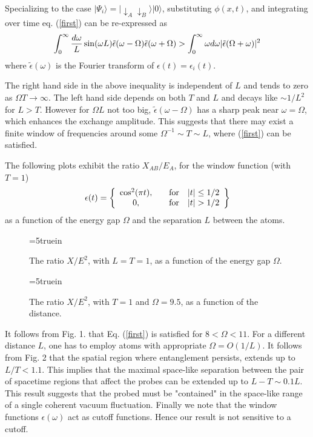 \documentclass[12pt]{article}
\newcommand{\beq}{\begin{equation}}
\newcommand{\eeq}{\end{equation}}
\def \ra {\rangle}
\def \down {\downarrow}
\begin{document}
Specializing to the case $|\Psi_i\ra=|\down_A\down_B\ra|0\ra$,
substituting $\phi(x,t)$, and
integrating over time
eq. (\ref{first}) can be re-expressed as
\beq
  \int_0^\infty {d\omega\over L} \sin({\omega L}) \tilde\epsilon
(\omega-\Omega)
\tilde\epsilon(\omega+\Omega) >
\int_0^\infty \omega d\omega |\tilde\epsilon (\Omega+\omega)|^2
\eeq
where $\tilde\epsilon(\omega)$
is the Fourier transform of $\epsilon(t)=\epsilon_i(t)$.

The right hand side in the above inequality is independent of $L$
and tends to
zero as $\Omega T\to \infty$. The left hand side depends on both
$T$ and $L$
and decays like $\sim 1/L^2$ for $L>T$.
However for $\Omega L$ not too big,
$\tilde \epsilon(\omega-\Omega)$ has a sharp peak near
 $\omega=\Omega$, which enhances the exchange amplitude.
This suggests that there may exist a finite window of
frequencies around some $\Omega^{-1}\sim T \sim L$, where
(\ref{first})
can be satisfied.

The following plots exhibit
the ratio $X_{AB}/E_A$, for the window function (with $T=1$)
\beq
\epsilon(t) = \left\{   \begin{array}{cc} {\cos^2(\pi t)},
& \ \ \ {\rm for} \ \ \ |t| \le 1/2 \\
              0 , &  \ \ \ {\rm for} \ \ \ |t|>1/2 \end{array}
\right\}
\eeq
as a function of the energy gap $\Omega$ and the separation $L$
between the atoms.

\begin{figure} \epsfxsize=5truein
      \centerline{}
\vspace {0.5cm}
  \caption[]{The ratio $X/E^2$,
with $L=T=1$, as a function of the energy gap $\Omega$.  }
    \label{ratio} \end{figure}

\begin{figure} \epsfxsize=5truein
      \centerline{}
\vspace {0.5cm}
  \caption[]{The ratio $X/E^2$, with $T=1$ and $\Omega=9.5$,
as a function of the distance.   }
    \label{ratiol} \end{figure}

It follows from Fig. 1. that Eq. (\ref{first}) is satisfied for
 $8<\Omega <11$.
 For a different distance $L$,
one has to employ atoms with appropriate $\Omega =O(1/L)$.
It follows from Fig. 2 that the spatial region where entanglement
persists,
extends up to $L/T<1.1$. This implies that the maximal
space-like separation between the pair of spacetime regions
that affect the probes  can be extended up to  $L-T \sim 0.1 L$.
This result suggests that the probed must be  "contained" in
the space-like range of a single coherent vacuum fluctuation.
Finally we note that the window functions $\epsilon(\omega)$ act
as
cutoff functions. Hence our result is not sensitive to a cutoff.
\end{document}

